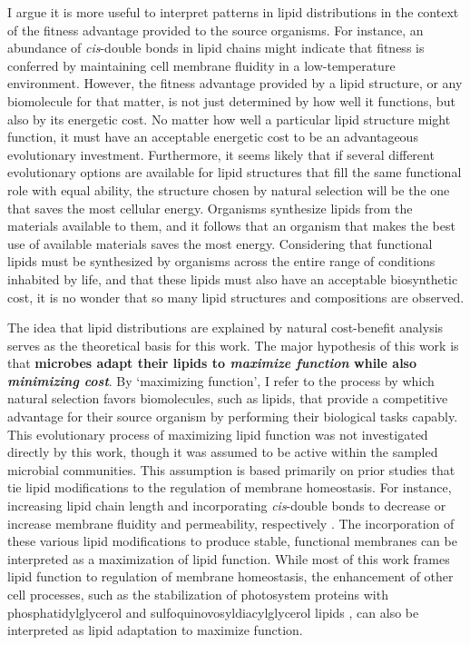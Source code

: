 I argue it is more useful to interpret patterns in lipid distributions in the context of the fitness advantage provided to the source organisms. For instance, an abundance of \textit{cis}-double bonds in lipid chains might indicate that fitness is conferred by maintaining cell membrane fluidity in a low-temperature environment. However, the fitness advantage provided by a lipid structure, or any biomolecule for that matter, is not just determined by how well it functions, but also by its energetic cost. No matter how well a particular lipid structure might function, it must have an acceptable energetic cost to be an advantageous evolutionary investment. Furthermore, it seems likely that if several different evolutionary options are available for lipid structures that fill the same functional role with equal ability, the structure chosen by natural selection will be the one that saves the most cellular energy. Organisms synthesize lipids from the materials available to them, and it follows that an organism that makes the best use of available materials saves the most energy. Considering that functional lipids must be synthesized by organisms across the entire range of conditions inhabited by life, and that these lipids must also have an acceptable biosynthetic cost, it is no wonder that so many lipid structures and compositions are observed. 

The idea that lipid distributions are explained by natural cost-benefit analysis serves as the theoretical basis for this work. The major hypothesis of this work is that \textbf{microbes adapt their lipids to \textit{maximize function} while also \textit{minimizing cost}}. By `maximizing function', I refer to the process by which natural selection favors biomolecules, such as lipids, that provide a competitive advantage for their source organism by performing their biological tasks capably. This evolutionary process of maximizing lipid function was not investigated directly by this work, though it was assumed to be active within the sampled microbial communities. This assumption is based primarily on prior studies that tie lipid modifications to the regulation of membrane homeostasis. For instance, increasing lipid chain length and incorporating \textit{cis}-double bonds to decrease or increase membrane fluidity and permeability, respectively \citep[see review by][]{zhang2008membrane}. The incorporation of these various lipid modifications to produce stable, functional membranes can be interpreted as a maximization of lipid function. While most of this work frames lipid function to regulation of membrane homeostasis, the enhancement of other cell processes, such as the stabilization of photosystem proteins with phosphatidylglycerol and sulfoquinovosyldiacylglycerol lipids \citep{sato2004roles}, can also be interpreted as lipid adaptation to maximize function.

